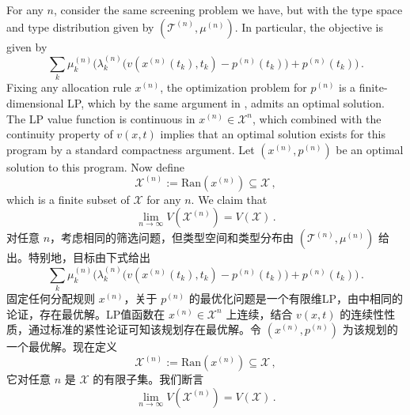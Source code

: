 \documentclass[12pt,letterpaper]{article}
\newenvironment{original}{\color{black}\noindent}{}
\newenvironment{translation}{\color{blue}\noindent}{}
\theoremstyle{plain}
\theoremstyle{definition}
\theoremstyle{remark}
\renewcommand{\1}{\mathds{1}}
\newcommand{\X}{\mathcal{X}}
\theoremstyle{definition}
\begin{document}
\begin{original}
For any $n$, consider the same screening problem we have, but with the type space and type distribution given by $(\mathcal{T}^{(n)}, \mu^{(n)})$. In particular, the objective is given by
\[\sum_k \mu^{(n)}_k  \Big(\lambda^{(n)}_k\big(v(x^{(n)}(t_k),t_k) -p^{(n)}(t_k)\big) + p^{(n)}(t_k)\Big)\,. \]
Fixing any allocation rule $x^{(n)}$, the optimization problem for $p^{(n)}$ is a finite-dimensional LP, which by the same argument in , admits an optimal solution. The LP value function is continuous in $x^{(n)} \in \X^n$, which combined with the continuity property of $v(x, t)$ implies that an optimal solution exists for this program by a standard compactness argument. Let $(x^{(n)}, p^{(n)})$ be an optimal solution to this program. Now define
\[ \X^{(n)} := \text{Ran}(x^{(n)}) \subseteq \X\,,\]
which is a finite subset of $\X$ for any $n$. We claim that
\[\lim_{n \rightarrow \infty} V(\X^{(n)}) = V(\X)\,.\]
\end{original}
\begin{translation}
对任意 $n$，考虑相同的筛选问题，但类型空间和类型分布由 $(\mathcal{T}^{(n)}, \mu^{(n)})$ 给出。特别地，目标由下式给出
\[\sum_k \mu^{(n)}_k  \Big(\lambda^{(n)}_k\big(v(x^{(n)}(t_k),t_k) -p^{(n)}(t_k)\big) + p^{(n)}(t_k)\Big)\,. \]
固定任何分配规则 $x^{(n)}$，关于 $p^{(n)}$ 的最优化问题是一个有限维LP，由中相同的论证，存在最优解。LP值函数在 $x^{(n)} \in \X^n$ 上连续，结合 $v(x, t)$ 的连续性性质，通过标准的紧性论证可知该规划存在最优解。令 $(x^{(n)}, p^{(n)})$ 为该规划的一个最优解。现在定义
\[ \X^{(n)} := \text{Ran}(x^{(n)}) \subseteq \X\,,\]
它对任意 $n$ 是 $\X$ 的有限子集。我们断言
\[\lim_{n \rightarrow \infty} V(\X^{(n)}) = V(\X)\,.\]
\end{translation}
\end{document}
